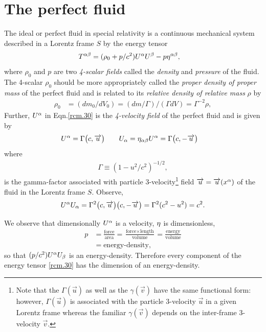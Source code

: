 \section{The perfect fluid}  
The ideal or perfect fluid in special relativity is a  
continuous mechanical system described in a  Lorentz 
frame $S$ by the energy tensor  
\begin{align}\label{rcm.30}
T^{{\alpha}{\beta}}&=(\rho_0 +p/c^2) U^{{\alpha}} U^{{\beta}} - p
\eta^{{\alpha}{\beta}},
\end{align}
where $\rho_0$ and $p$ are two \textsl{4-scalar fields} 
called the \textsl{density} and \textsl{pressure} of the 
fluid.   The 4-scalar $\rho_0$ should be more 
appropriately called the \textsl{proper density of proper 
mass} of the  perfect fluid and is related to its 
\textsl{relative density of relative mass} $\rho$ by
\begin{align}\label{rcm.31}
\rho_0 &= (dm_0/dV_0) = (dm/ \Gamma)/(\Gamma
dV)=\Gamma^{-2}\rho,
\end{align}
Further, $U^{{\alpha}}$ in Eqn.\eqref{rcm.30} is the 
\textsl{4-velocity field} of the   perfect fluid and is given by
\begin{align}\label{rcm.32}
U^{{\alpha}} &=\Gamma\big(c,\overrightarrow{u}\big)\qquad
U_{{\alpha}}  ={\eta}_{{\alpha}{\beta}}U^{{\alpha}}=
\Gamma\big(c,-\overrightarrow{u}\big)
\end{align}
where
\begin{align}\label{rcm.33}
\Gamma \equiv (1-u^2/c^2)^{-1/2},
\end{align}
is the gamma-factor associated with particle 
3-velocity\footnote{Note that the $\Gamma(\vec{u})$ as well 
as the $\gamma(\vec{v})$ have the same functional form: 
however, $\Gamma(\vec{u})$ is associated with the particle 
3-velocity $\vec{u}$ in a given Lorentz frame whereas the 
familiar $\gamma(\vec{v})$ depends on the  inter-frame  
3-velocity $\vec{v}$.} field $\overrightarrow{u}=\overrightarrow{u}(x^{{\alpha}})$ of 
the 
fluid in the Lorentz frame $S$. Observe,
\begin{align}\label{rcm.34}
U^{{\alpha}} U_{{\alpha}}=\Gamma^2\big(c,\overrightarrow{u}\big)
\big(c,-\overrightarrow{u}\big)=\Gamma^2(c^2-u^2)=c^2.
\end{align}

We observe that dimensionally $U^{{\alpha}}$ is a velocity, 
${\eta}$ is dimensionless,
\begin{align*}
p&=\frac{\text{force}}{\text{area}} 
=\frac{\text{force}\times
\text{length}}{\text{volume}}=
\frac{\text{energy}}{\text{volume}}\\
&=\text{energy-density},
\end{align*}
so that $ (p/c^2) U^{{\alpha}} U_{{\beta}} $ is an energy-density. 
Therefore every component of the energy tensor 
\eqref{rcm.30} has the dimension of an energy-density.

